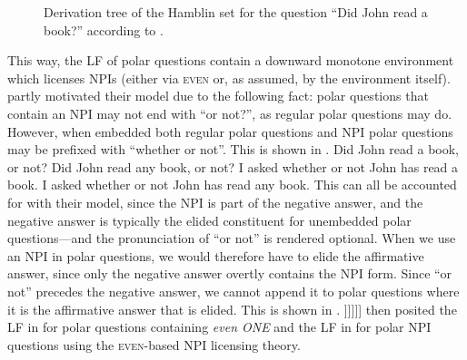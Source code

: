 \begin{figure}[!htb]
    \centering
    \resizebox{\linewidth}{!}{} 
    \caption{Derivation tree of the Hamblin set for the question \enquote{Did John read a book?} according to \textcite{Guerzoni2014-enviro}.}
\end{figure}

\noindent This way, the LF of polar questions contain a downward monotone environment which licenses NPIs (either via {\scshape even} or, as \textcite{Guerzoni2014-enviro} assumed, by the environment itself). \textcite{Guerzoni2014-enviro} partly motivated their model due to the following fact: polar questions that contain an NPI may not end with \enquote{or not?}, as regular polar questions may do. However, when embedded both regular polar questions and NPI polar questions may be prefixed with \enquote{whether or not}. This is shown in .
\pex\label{ex:q-elision-restriction}
\a Did John read a book, or not?
\a \ljudge{\#}Did John read any book, or not?
\a I asked whether or not John has read a book.
\a I asked whether or not John has read any book.
\xe
This can all be accounted for with their model, since the NPI is part of the negative answer, and the negative answer is typically the elided constituent for unembedded polar questions---and the pronunciation of \enquote{or not} is rendered optional. When we use an NPI in polar questions, we would therefore have to elide the affirmative answer, since only the negative answer overtly contains the NPI form. Since \enquote{or not} precedes the negative answer, we cannot append it to polar questions where it is the affirmative answer that is elided. This is shown in .
\ex
[] [whether\textsuperscript{L} [ 1 [ Q [ \sout{[John read a book]} (or\textsubscript{1} [ not) [John read any book] ]\hspace{0.5mm}]\hspace{0.5mm}]\hspace{0.5mm}]\hspace{0.5mm}]
\xe
\textcite{Crnic2014-dogma,Crnic2014-nm} then posited the LF in  for polar questions containing \textit{even \MakeUppercase{one}} and the LF in  for polar NPI questions using the {\scshape even}-based NPI licensing theory.
\ex
[] 
